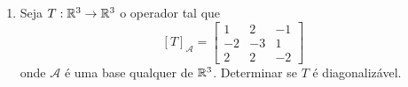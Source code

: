 \begin{exemplo}
\begin{enumerate}
\begin{solucao}
\begin{itemize}
				\[
					\begin{bmatrix}
						0 & -3 & -4\\
						0 & 0 & 5\\
						0 & 0 & -4
					\end{bmatrix}\begin{bmatrix}
						x\\y\\z
					\end{bmatrix} = \begin{bmatrix}
						0\\0\\0
					\end{bmatrix}.
				\]
				Assim
				\[
					\aut_T(3) = \{(x,0,0) \mid x \in \real\} = [(1,0,0)]
				\]
				e ent\~ao $\mathcal{B}_1 = \{(1,0,0)\}$ \'e uma base de $\aut_T(3)$ e $\dim_\real\aut_T(3) = 1$.
				\item Para $\lambda_2 = -1$ temos que $(x,y,z) \in \aut_T(-1)$ se, e s\'o se,
				\[
					\begin{bmatrix}
						4 & -3 & -4\\
						0 & 4 & 5\\
						0 & 0 & 0
					\end{bmatrix}\begin{bmatrix}
						x\\y\\z
					\end{bmatrix} = \begin{bmatrix}
						0\\0\\0
					\end{bmatrix}.
				\]
				Assim
				\[
					\aut_T(-1) = \{(z/16,-5z/4,z) \mid z \in \real\} = [(1/16,-5/4,1)]
				\]
				e ent\~ao $\mathcal{B}_2 = \{(1/16,-5/4,1)\}$ \'e uma base de $\aut_T(-1)$ e $\dim_\real\aut_T(-1) = 1$.
			\end{itemize}
			Note que o conjunto $\mathcal{B} = \mathcal{B}_1 \cup \mathcal{B}_2$ \'e L.I. mas n\~ao \'e uma base de $\real^3$. Neste caso o operador $T$ n\~ao \'e diagonaliz\'avel.
		\end{solucao}
		\item Seja $T : \mathbb{R}^3 \to \mathbb{R}^3$ o operador tal que
		\[
			[T]_\mathcal{A} = \begin{bmatrix}
								1 & 2 & -1\\
								-2 & -3 & 1\\
								2 & 2 & -2
							\end{bmatrix}
		\]
		onde $\mathcal{A}$ \'e uma base qualquer de $\real^3$. Determinar se $T$ \'e diagonaliz\'avel.

\end{enumerate}
\end{exemplo}
